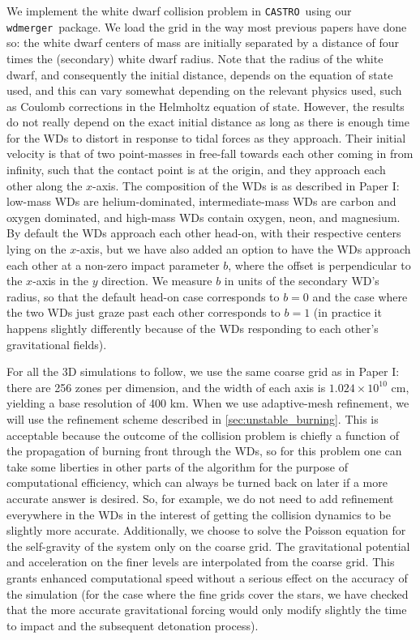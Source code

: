 \documentclass[twocolumn,numberedappendix]{../aastex6}
\newcommand{\castro}{\texttt{CASTRO}}
\newcommand{\wdmerger}{\texttt{wdmerger}}
\begin{document}
We implement the white dwarf collision problem in \castro\ using our \wdmerger\
package. We load the grid in the way most previous papers have done so:
the white dwarf centers of mass are initially separated by a distance of four times
the (secondary) white dwarf radius. Note that the radius of the white dwarf, and
consequently the initial distance, depends on the equation of state used, and this
can vary somewhat depending on the relevant physics used, such as Coulomb corrections
in the Helmholtz equation of state. However, the results do not really depend on the
exact initial distance as long as there is enough time for the WDs to distort in
response to tidal forces as they approach. Their initial velocity is that of
two point-masses in free-fall towards each other coming in from infinity, such that
the contact point is at the origin, and they approach each other along the $x$-axis.
The composition of the WDs is as described in Paper I: low-mass WDs are helium-dominated,
intermediate-mass WDs are carbon and oxygen dominated, and high-mass WDs contain
oxygen, neon, and magnesium. By default the WDs approach each other head-on, with
their respective centers lying on the $x$-axis, but we have also added an option
to have the WDs approach each other at a non-zero impact parameter $b$, where the
offset is perpendicular to the $x$-axis in the $y$ direction. We measure
$b$ in units of the secondary WD's radius, so that the default head-on case
corresponds to $b = 0$ and the case where the two WDs just graze past each other
corresponds to $b = 1$ (in practice it happens slightly differently because
of the WDs responding to each other's gravitational fields).

For all the 3D simulations to follow, we use the same coarse grid as in Paper I:
there are 256 zones per dimension, and the width of each axis is $1.024 \times 10^{10}$
cm, yielding a base resolution of 400 km. When we use adaptive-mesh refinement, we will
use the refinement scheme described in \autoref{sec:unstable_burning}. This is
acceptable because the outcome of the collision problem is chiefly a function
of the propagation of burning front through the WDs, so for this problem one
can take some liberties in other parts of the algorithm for the purpose of
computational efficiency, which can always be turned back on later if a more
accurate answer is desired. So, for example, we do not need to add refinement
everywhere in the WDs in the interest of getting the collision dynamics to be
slightly more accurate. Additionally, we choose to solve the Poisson equation
for the self-gravity of the system only on the coarse grid. The gravitational
potential and acceleration on the finer levels are interpolated from the coarse
grid. This grants enhanced computational speed without a serious effect on the
accuracy of the simulation (for the case where the fine grids cover the stars,
we have checked that the more accurate gravitational forcing would only modify
slightly the time to impact and the subsequent detonation process).
\end{document}
